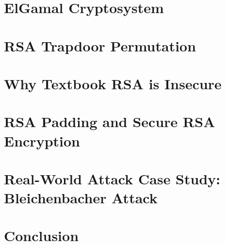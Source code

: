 \documentclass[12pt,a4paper]{article}
\begin{document}
\section{ElGamal Cryptosystem}


\section{RSA Trapdoor Permutation}


\section{Why Textbook RSA is Insecure}


\section{RSA Padding and Secure RSA Encryption}


\section{Real-World Attack Case Study: Bleichenbacher Attack}


\section{Conclusion}

\end{document}
